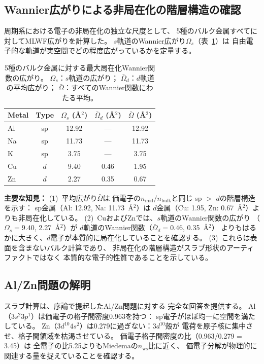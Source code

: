 \documentclass[twocolumn,showpacs,preprintnumbers,amsmath,amssymb,prb]{revtex4-2}
\begin{document}
\subsection{Wannier広がりによる非局在化の階層構造の確認}

周期系における電子の非局在化の独立な尺度として、
5種のバルク金属すべてに対してMLWF広がりを計算した。
$s$軌道のWannier広がり$\Omega_s$（表~\ref{tab:wannier}）は
自由電子的な軌道が実空間でどの程度広がっているかを定量する。

\begin{table}[h]
\caption{\label{tab:wannier}
5種のバルク金属に対する最大局在化Wannier関数の広がり。
$\Omega_s$：$s$軌道の広がり；
$\bar{\Omega}_d$：$d$軌道の平均広がり；
$\bar{\Omega}$：すべてのWannier関数にわたる平均。}
\begin{ruledtabular}
\begin{tabular}{lcccc}
Metal & Type & $\Omega_s$ (\AA$^2$) & $\bar{\Omega}_d$ (\AA$^2$) & $\bar{\Omega}$ (\AA$^2$) \\
\hline
Al & sp & 12.92 & --- & 12.92 \\
Na & sp & 11.73 & --- & 11.73 \\
K  & sp &  3.75 & --- &  3.75 \\
Cu & $d$ &  9.40 & 0.46 & 1.95 \\
Zn & $d$ &  2.27 & 0.35 & 0.67 \\
\end{tabular}
\end{ruledtabular}
\end{table}

\textbf{主要な知見：}
(1)~平均広がり$\bar{\Omega}$は
価電子の$n_\mathrm{mid}/n_\mathrm{bulk}$と同じ
sp $>$ $d$の階層構造を示す：
sp金属（Al: 12.92, Na: 11.73~\AA$^2$）は
$d$金属（Cu: 1.95, Zn: 0.67~\AA$^2$）よりも非局在化している。
(2)~CuおよびZnでは、$s$軌道のWannier関数の広がり
（$\Omega_s = 9.40$, 2.27~\AA$^2$）が
$d$軌道のWannier関数（$\bar{\Omega}_d = 0.46$, 0.35~\AA$^2$）
よりもはるかに大きく、$d$電子が本質的に局在化していることを確認する。
(3)~これらは表面を含まないバルク計算であり、
非局在化の階層構造がスラブ形状のアーティファクトではなく
本質的な電子的性質であることを示している。


\subsection{Al/Zn問題の解明}

スラブ計算は、序論で提起したAl/Zn問題に対する
完全な回答を提供する。
Al（$3s^2 3p^1$）は価電子の格子間密度0.963を持つ：
sp電子がほぼ均一に空間を満たしている。
Zn（$3d^{10} 4s^2$）は0.279に過ぎない：$3d^{10}$殻が
電荷を原子核に集中させ、格子間領域を枯渇させている。
価電子格子間密度の比（0.963/0.279 = 3.45）は
全電子の比5.25よりもMiedemaの$n_\mathrm{ws}$比に近く、
価電子分解が物理的に関連する量を捉えていることを確認する。
\end{document}
